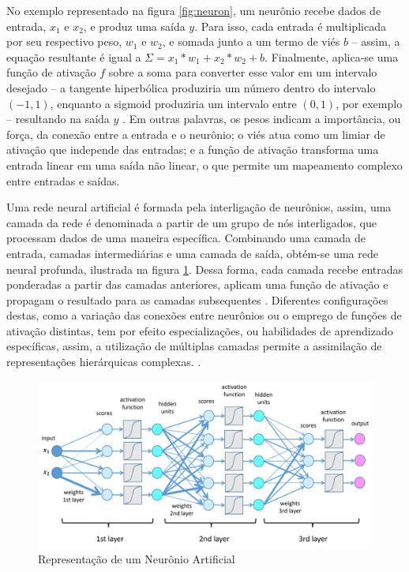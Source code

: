 No exemplo representado na figura \ref{fig:neuron}, um neurônio recebe dados de entrada, $x_1$ e $x_2$, e produz uma saída $y$. Para isso, cada entrada é multiplicada por seu respectivo peso, $w_1$ e $w_2$, e somada junto a um termo de viés $b$ -- assim, a equação resultante é igual a $\Sigma = x_1*w_1 + x_2*w_2 + b$. Finalmente, aplica-se uma função de ativação $f$ sobre a soma para converter esse valor em um intervalo desejado -- a tangente hiperbólica produziria um número dentro do intervalo $(-1, 1)$, enquanto a sigmoid produziria um intervalo entre $(0, 1)$, por exemplo -- resultando na saída $y$ \cite{deeplearningbook}. Em outras palavras, os pesos indicam a importância, ou força, da conexão entre a entrada e o neurônio; o viés atua como um limiar de ativação que independe das entradas; e a função de ativação transforma uma entrada linear em uma saída não linear, o que permite um mapeamento complexo entre entradas e saídas. 

Uma rede neural artificial é formada pela interligação de neurônios, assim, uma camada da rede é denominada a partir de um grupo de nós interligados, que processam dados de uma maneira específica. Combinando uma camada de entrada, camadas intermediárias e uma camada de saída, obtém-se uma rede neural profunda, ilustrada na figura \ref{fig:dnn}. Dessa forma, cada camada recebe entradas ponderadas a partir das camadas anteriores, aplicam uma função de ativação e propagam o resultado para as camadas subsequentes \cite{deeplearningbook}. Diferentes configurações destas, como a variação das conexões entre neurônios ou o emprego de funções de ativação distintas, tem por efeito especializações, ou habilidades de aprendizado específicas, assim, a utilização de múltiplas camadas permite a assimilação de representações hierárquicas complexas. \cite{reviewdeep}.

\begin{figure}[H]
	\caption{\label{fig:dnn}Representação de um Neurônio Artificial}
    \begin{center}
    \includegraphics[width=1\linewidth]{images/dnn.png}
	\end{center}
\end{figure}


